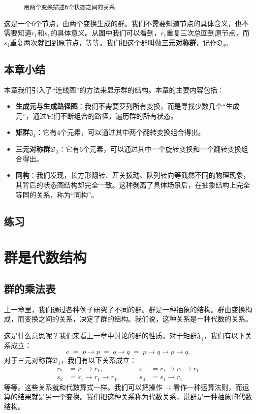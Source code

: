 \documentclass[12pt,UTF8,fontset=none]{ctexbook}
\begin{document}
\begin{figure}[htbp]
\begin{tikzpicture}[>=Stealth, thick, font=\normalsize]
    \end{tikzpicture}
    \caption{\texttt{用两个变换描述6个状态之间的关系}}
    \label{fig:s3-cayley}
\end{figure}

\vspace{12pt}
这是一个$6$个节点，由两个变换生成的群。我们不需要知道节点的具体含义，也不需要知道$r_1$和$s_1$的具体意义。从图中我们可以看到，$r_1$重复三次总回到原节点，而$s_1$重复两次就回到原节点，等等。我们把这个群叫做\textbf{三元对称群}，记作$\mathfrak{D}_3$。

\clearpage
\section*{本章小结}

本章我们引入了“连线图”的方法来显示群的结构。本章的主要内容包括：
\begin{itemize}
    \item \textbf{生成元与生成路径图}：我们不需要罗列所有变换，而是寻找少数几个“生成元”，通过它们不断组合的路径，遍历群的所有状态。
    \item \textbf{矩群}$\mathfrak{J}_4$：它有$4$个元素，可以通过其中两个翻转变换组合得出。
    \item \textbf{三元对称群}$\mathfrak{D}_3$：它有$6$个元素，可以通过其中一个旋转变换和一个翻转变换组合得出。
    \item \textbf{同构}：我们发现，长方形翻转、开关拨动、队列转向等截然不同的物理现象，其背后的状态图结构却完全一致。这种剥离了具体场景后，在抽象结构上完全等同的关系，称为“同构”。
\end{itemize}

\clearpage
\section{练习}

\chapter{群是代数结构}

\section{群的乘法表}

上一章里，我们通过各种例子研究了不同的群。群是一种抽象的结构。群由变换构成，而变换之间的关系，决定了群的结构。我们说，这种关系是一种代数的关系。

这是什么意思呢？我们来看上一章中讨论的群的性质。对于矩群$\mathfrak{J}_4$，我们有以下关系成立：
$$ e \;=\; p\rightarrow p \;=\; q\rightarrow q \;=\; p\rightarrow q\rightarrow p\rightarrow q. $$
对于三元对称群$\mathfrak{D}_3$，我们有以下关系成立：
\begin{align*}
    r_2 &= r_1\rightarrow r_1, &\qquad e &= r_1\rightarrow r_1\rightarrow r_1 \\
    s_2 &= s_1\rightarrow r_1\rightarrow r_1, &\qquad s_3 &= s_1\rightarrow r_1 
\end{align*}
等等。这些关系就和代数算式一样。我们可以把操作$\rightarrow$看作一种运算法则，而运算的结果就是另一个变换。我们把这种关系称为代数关系，说群是一种抽象的代数结构。
\end{document}
